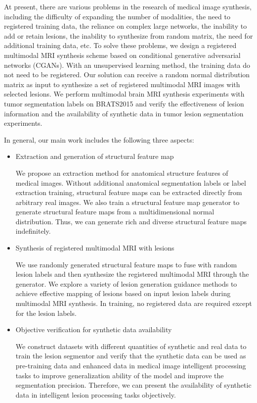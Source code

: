 \documentclass{ecai}
\begin{document}
At present, there are various problems in the research of medical image synthesis, including the difficulty of expanding the number of modalities, the need to registered training data, the reliance on complex large networks, the inability to add or retain lesions, the inability to synthesize from random matrix, the need for additional training data, etc. 
To solve these problems, we design a registered multimodal MRI synthesis scheme based on  conditional generative adversarial networks (CGANs)\cite{70mirza2014conditional}. With an unsupervised learning method, the training data do not need to be registered. Our solution can receive a random normal distribution matrix as input to synthesize a set of registered multimodal MRI images with selected lesions. We perform multimodal brain MRI synthesis experiments with tumor segmentation labels on BRATS2015 and verify the effectiveness of lesion information and the availability of synthetic data in tumor lesion segmentation experiments. 

In general, our main work includes the following three aspects:

\begin{itemize}
	\item{Extraction and generation of structural feature map}
	
	We propose an extraction method for anatomical structure features of medical images. Without additional anatomical segmentation labels or label extraction training, structural feature maps can be extracted directly from arbitrary real images. We also train a structural feature map generator to generate structural feature maps from a multidimensional normal distribution. Thus, we can generate rich and diverse structural feature maps indefinitely.
	
	\item{Synthesis of registered multimodal MRI with lesions}	
	
	We use randomly generated structural feature maps to fuse with random lesion labels and then synthesize the registered multimodal MRI through the generator. We explore a variety of lesion generation guidance methods to achieve effective mapping of lesions based on input lesion labels during multimodal MRI synthesis. In training, no registered data are required except for the lesion labels. 
	
	\item{Objective verification for synthetic data availability}
	
	We construct datasets with different quantities of synthetic and real data to train the lesion segmentor and verify that the synthetic data can be used as pre-training data and enhanced data in medical image intelligent processing tasks to improve generalization ability of the model and improve the segmentation precision. Therefore, we can present the availability of synthetic data in intelligent lesion processing tasks objectively.
\end{itemize}
\end{document}
